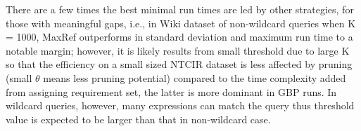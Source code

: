 \documentclass[runningheads]{llncs}
\begin{document}
There are a few times the best minimal run times are led by other strategies, for those with meaningful gaps, i.e., in Wiki dataset of non-wildcard queries when K = 1000, MaxRef outperforms in standard deviation and maximum run time to a notable margin; however, it is likely results from small threshold due to large K so that the efficiency on a small sized NTCIR dataset is less affected by pruning (small $\theta$ means less pruning potential) compared to the time complexity added from assigning requirement set, the latter is more dominant in GBP runs. In wildcard queries, however, many expressions can match the query thus threshold value is expected to be larger than that in non-wildcard case.
\begin{figure}[!t]
\begin{center}

\hspace*{-3.6cm} 


\end{center}
\end{figure}
\end{document}
